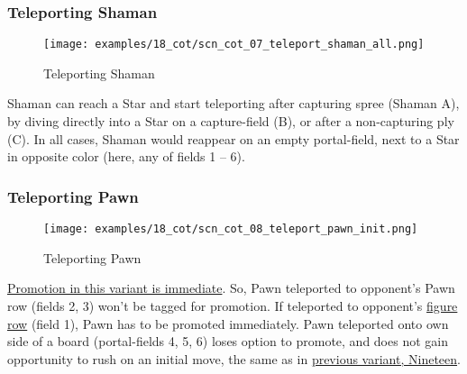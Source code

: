\clearpage %

\subsubsection*{Teleporting Shaman}
\label{sec:Conquest of Tlalocan/Shaman/Movement/Teleporting Shaman}

\vspace*{-1.4\baselineskip}
\noindent
\begin{figure}[!h]
\texttt{[image: examples/18\_cot/scn\_cot\_07\_teleport\_shaman\_all.png]}
\caption{Teleporting Shaman}
\label{fig:scn_cot_07_teleport_shaman_all}
\end{figure}

Shaman can reach a Star and start teleporting after capturing spree (Shaman A),
by diving directly into a Star on a capture-field (B), or after a non-capturing
ply (C). In all cases, Shaman would reappear on an empty portal-field, next to a
Star in opposite color (here, any of fields 1 -- 6).

\clearpage %

\subsubsection*{Teleporting Pawn}
\label{sec:Conquest of Tlalocan/Shaman/Movement/Teleporting Pawn}

\vspace*{-1.4\baselineskip}
\noindent
\begin{figure}[!h]
\texttt{[image: examples/18\_cot/scn\_cot\_08\_teleport\_pawn\_init.png]}
\caption{Teleporting Pawn}
\label{fig:scn_cot_08_teleport_pawn_init}
\end{figure}

\hyperref[sec:Conquest of Tlalocan/Promotion]{Promotion in this variant is immediate}.
So, Pawn teleported to opponent's Pawn row (fields 2, 3) won't be tagged for promotion.
If teleported to opponent's \hyperref[sec:Terms/Figure row]{figure row} (field 1),
Pawn has to be promoted immediately.
Pawn teleported onto own side of a board (portal-fields 4, 5, 6) loses option to
promote, and does not gain opportunity to rush on an initial move, the same as in
\hyperref[fig:scn_n_12_teleport_pawns_step_1]{previous variant, Nineteen}.

